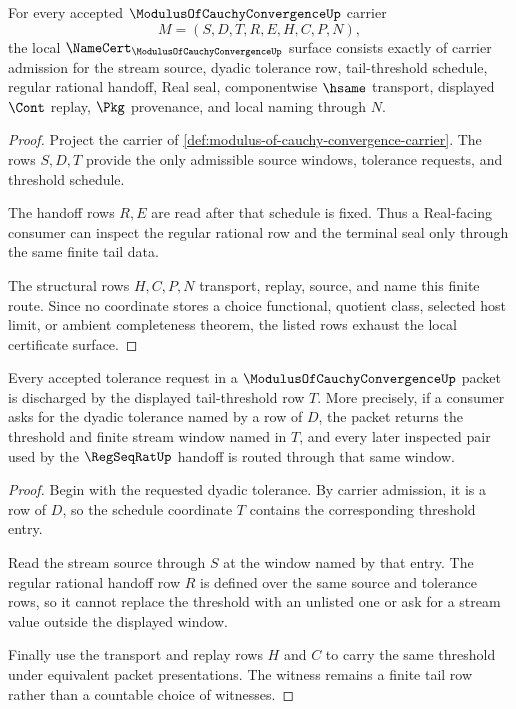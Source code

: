 \begin{theorem}
\label{thm:modulus-of-cauchy-convergence-namecert-obligations}
For every accepted $\ModulusOfCauchyConvergenceUp$ carrier
$$
M=(S,D,T,R,E,H,C,P,N),
$$
the local $\NameCert_{\ModulusOfCauchyConvergenceUp}$ surface consists exactly of carrier admission for the stream source, dyadic tolerance row, tail-threshold schedule, regular rational handoff, Real seal, componentwise $\hsame$ transport, displayed $\Cont$ replay, $\Pkg$ provenance, and local naming through $N$.
\end{theorem}
\begin{proof}
Project the carrier of \autoref{def:modulus-of-cauchy-convergence-carrier}. The rows $S,D,T$ provide the only admissible source windows, tolerance requests, and threshold schedule.

The handoff rows $R,E$ are read after that schedule is fixed. Thus a Real-facing consumer can inspect the regular rational row and the terminal seal only through the same finite tail data.

The structural rows $H,C,P,N$ transport, replay, source, and name this finite route. Since no coordinate stores a choice functional, quotient class, selected host limit, or ambient completeness theorem, the listed rows exhaust the local certificate surface.
\end{proof}

\begin{theorem}
\label{thm:modulus-of-cauchy-convergence-tail-witness}
Every accepted tolerance request in a $\ModulusOfCauchyConvergenceUp$ packet is discharged by the displayed tail-threshold row $T$. More precisely, if a consumer asks for the dyadic tolerance named by a row of $D$, the packet returns the threshold and finite stream window named in $T$, and every later inspected pair used by the $\RegSeqRatUp$ handoff is routed through that same window.
\end{theorem}
\begin{proof}
Begin with the requested dyadic tolerance. By carrier admission, it is a row of $D$, so the schedule coordinate $T$ contains the corresponding threshold entry.

Read the stream source through $S$ at the window named by that entry. The regular rational handoff row $R$ is defined over the same source and tolerance rows, so it cannot replace the threshold with an unlisted one or ask for a stream value outside the displayed window.

Finally use the transport and replay rows $H$ and $C$ to carry the same threshold under equivalent packet presentations. The witness remains a finite tail row rather than a countable choice of witnesses.
\end{proof}

